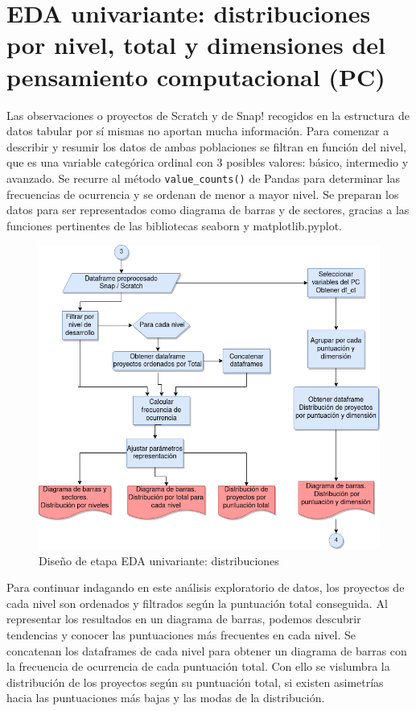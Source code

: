 \documentclass[a4paper, 12pt]{book}
\begin{document}
\section{EDA univariante: distribuciones por nivel, total y dimensiones del pensamiento computacional (PC)} 
\label{sec:EDA_univariante}

Las observaciones o proyectos de Scratch y de Snap! recogidos en la estructura de datos tabular por sí mismas no aportan mucha información. Para comenzar a describir y resumir los datos de ambas poblaciones se filtran en función del nivel, que es una variable categórica ordinal con 3 posibles valores: básico, intermedio y avanzado. Se recurre al método \texttt{value\_counts()} de Pandas para determinar las frecuencias de ocurrencia y se ordenan de menor a mayor nivel. Se preparan los datos para ser representados como diagrama de barras y de sectores, gracias a las funciones pertinentes de las bibliotecas seaborn y matplotlib.pyplot.  

\begin{figure}[H]
    \centering
    \includegraphics[height=.5\textheight]{img/diseno_distribucion}
    \caption{Diseño de etapa EDA univariante: distribuciones}\label{fig:eda_uni}
\end{figure}

Para continuar indagando en este análisis exploratorio de datos, los proyectos de cada nivel son ordenados y filtrados según la puntuación total conseguida. Al representar los resultados en un diagrama de barras, podemos descubrir tendencias y conocer las puntuaciones más frecuentes en cada nivel.
Se concatenan los dataframes de cada nivel para obtener un diagrama de barras con la frecuencia de ocurrencia de cada puntuación total. Con ello se vislumbra la distribución de los proyectos según su puntuación total, si existen asimetrías hacia las puntuaciones más bajas y las modas de la distribución.
\end{document}
